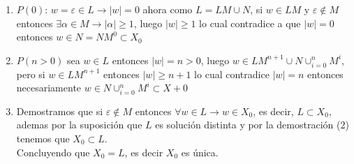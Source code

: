 \documentclass[a4paper, 12pt]{article}
\begin{document}
\begin{enumerate}
\begin{enumerate}[label = -]
        \item $P(0)$: $w = \varepsilon \in L \rightarrow |w| = 0$ ahora como $L = LM \cup N$, si $w \in LM$ y $\varepsilon \notin M$ entonces $\exists \alpha \in M \rightarrow |\alpha| \geq 1$, luego $|w| \geq 1$ lo cual contradice a que $|w| = 0$ entonces $w \in N = NM^{0} \subset X_{0}$

        \item $P(n > 0)$ sea $w \in L$ entonces $|w| = n > 0$, luego $w \in LM^{n + 1} \cup N \cup^{n}_{i = 0}M^{i}$, pero si $w \in LM^{n + 1}$ entonces $|w| \geq n + 1$ lo cual contradice $|w| = n$ entonces necesariamente $w \in N \cup^{n}_{i = 0}M^{i} \subset X+{0}$

        \item Demostramos que si $\varepsilon \notin M$ entonces $\forall w \in L \rightarrow w \in X_{0}$, es decir, $L \subset X_{0}$, ademas por la suposición que $L$ es solución distinta y por la demostración (2) tenemos que $X_{0} \subset L$. 
        \\ Concluyendo que $X_{0} = L$, es decir $X_{0}$ es única.
    \end{enumerate}


\end{enumerate}
\end{document}
